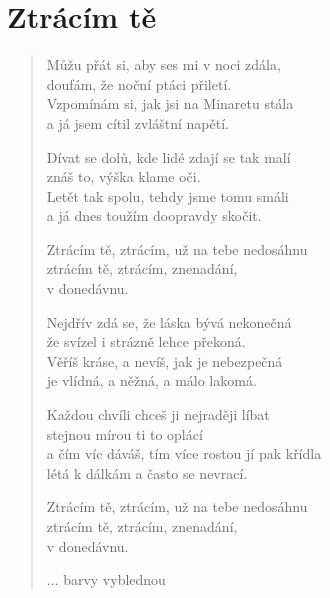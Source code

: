 \section*{Ztrácím tě}

\begin{verse}
Můžu přát si, aby ses mi v noci zdála,\\
doufám, že noční ptáci přiletí. \\
Vzpomínám si, jak jsi na Minaretu stála \\
a já jsem cítil zvláštní napětí.

Dívat se dolů, kde lidé zdají se tak malí\\
znáš to, výška klame oči.\\
Letět tak spolu, tehdy jsme tomu smáli\\
a já dnes toužím doopravdy skočit.

Ztrácím tě, ztrácím, už na tebe nedosáhnu\\
ztrácím tě, ztrácím, znenadání,\\
v donedávnu.

Nejdřív zdá se, že láska bývá nekonečná\\
že svízel i strázně lehce překoná.\\
Věříš kráse, a nevíš, jak je nebezpečná\\
je vlídná, a něžná, a málo lakomá.

Každou chvíli chceš ji nejraději líbat\\
stejnou mírou ti to oplácí\\
a čím víc dáváš, tím více rostou jí pak křídla\\
létá k dálkám a často se nevrací.

Ztrácím tě, ztrácím, už na tebe nedosáhnu\\
ztrácím tě, ztrácím, znenadání,\\
v donedávnu.


... barvy vyblednou 

\end{verse}
